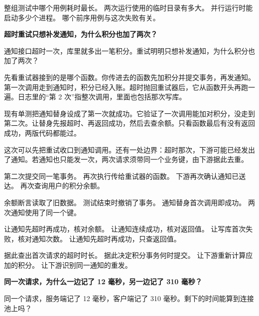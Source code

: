 \documentclass[UTF8, zihao=5, a4paper, fontset=fandol]{ctexart}
\begin{document}
\fourchoices
  {整组测试中哪个用例耗时最长。}
  {两次运行使用的临时目录有多大。}
  {并行运行时能启动多少个进程。}
  {哪个前序用例与这次失败有关。}


\begin{center}
{\heiti\bfseries 超时重试只想补发通知，为什么积分也加了两次？}
\end{center}

\noindent\urole 通知接口超时一次，库里就多出一笔积分。重试明明只想补发通知，为什么积分也加了两次？

\smallskip
\noindent\arole 先看重试器接到的是哪个函数。你传进去的函数先加积分并提交事务，再发通知。第一次调用走到通知时，积分已经入账。超时抛回重试器后，它从函数开头再跑一遍。日志里的“第 2 次”指整次调用，里面也包括那次写库。

现有单测把通知替身设成了第一次就成功。它验证了一次调用能加对积分，没走到第二次。让替身先报超时、再返回成功，然后去查余额。只看函数最后有没有返回成功，两版代码都能过。

这次可以先把重试收口到通知调用。还有一处边界：超时那次，下游可能已经发出了通知。若通知也只能发一次，两次请求须带同一个业务键，由下游据此去重。

\fourchoices
  {第二次提交同一笔事务。}
  {再次执行传给重试器的函数。}
  {下游再次确认通知已送达。}
  {再次查询用户的积分余额。}

\fourchoices
  {余额断言读取了旧数据。}
  {测试结束时撤销了事务。}
  {通知替身首次调用即成功。}
  {两次通知使用了同一个键。}

\fourchoices
  {让通知先超时再成功，核对余额。}
  {让通知连续成功，核对返回值。}
  {让写库首次失败，核对通知次数。}
  {让通知先超时再成功，只查返回值。}

\fourchoices
  {据此查出首次请求的超时时长。}
  {据此决定积分事务何时提交。}
  {让下游重新计算应加的积分。}
  {让下游识别同一通知的重发。}


\begin{center}
{\heiti\bfseries 同一次请求，为什么一边记了 12 毫秒，另一边记了 310 毫秒？}
\end{center}

\noindent\urole 同一个请求，服务端记了 12 毫秒，客户端记了 310 毫秒。剩下的时间能算到连接池上吗？
\end{document}
